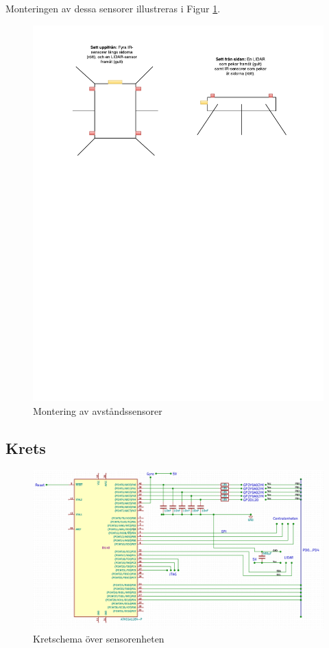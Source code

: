 \documentclass[a4paper,titlepage,12pt]{article}
\begin{document}
    Monteringen av dessa sensorer illustreras i Figur \ref{fig:sensor_mount}.

    \begin{figure}[h]
        \includegraphics[width=17cm, trim=2cm 18cm 0cm 0cm]{images/sensor_mount.pdf}
        \caption{Montering av avståndssensorer\label{fig:sensor_mount}}
    \end{figure}

    \newpage
    \subsection{Krets}

    \begin{figure}[h]
        \includegraphics[width=15cm]{images/schematic_sensor.png}
        \caption{Kretschema över sensorenheten\label{fig:schem_sensor}}
    \end{figure}
    
\end{document}
